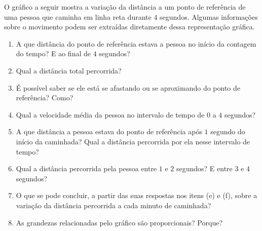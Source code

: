 \documentclass[10 pt,usenames,dvipsnames, oneside]{article}
\begin{document}
O gráfico a seguir mostra a variação da distância a um ponto de referência de uma pessoa que caminha em linha reta durante \(4\) segundos. Algumas informações sobre o movimento podem ser extraídas diretamente dessa representação gráfica.
\label{\detokenize{AF107-4:fig-tempo-distancia}}
\begin{figure}[H]
\centering



\label{\detokenize{AF107-4:fig-tempo-distancia}}\end{figure}
\begin{enumerate}
\item {} 
A que distância do ponto de referência estava a pessoa no início da contagem do tempo? E ao final de \(4\) segundos?

\item {} 
Qual a distância total percorrida?

\item {} 
É possível saber se ele está se afastando ou se aproximando do ponto de referência? Como?

\item {} 
Qual a velocidade média da pessoa no intervalo de tempo de \(0\) a \(4\) segundos?

\item {} 
A que distância a pessoa estava do ponto de referência após \(1\) segundo do início da caminhada? Qual a distância percorrida por ela nesse intervalo de tempo?

\item {} 
Qual a distância percorrida pela pessoa entre \(1\) e \(2\) segundos? E entre \(3\) e \(4\) segundos?

\item {} 
O que se pode concluir, a partir das suas respostas nos itens (e) e (f), sobre a variação da distância percorrida a cada minuto de caminhada?

\item {} 
As grandezas relacionadas pelo gráfico são proporcionais? Porque?

\end{enumerate}
\end{document}
